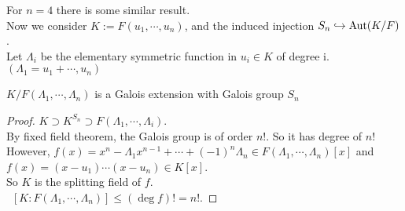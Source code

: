 For  $ n=4  $ there is some similar result.\\
Now we consider  $ K:=F(u_1,\cdots,u_n) $, and the induced injection  $ S_n\hookrightarrow \operatorname{Aut}(K/F)$.\\
Let  $ \Lambda_i  $ be the elementary symmetric function in  $ u_i\in K  $ of degree i. 
 $ (\Lambda_1=u_1+\cdots,u_n) $ 
 \begin{theorem}
     $ K/F(\Lambda_1,\cdots,\Lambda_n) $ is a Galois extension with Galois group  $ S_n $ 
 \end{theorem}
 \begin{proof}
     $ K\supset K^{S_n}\supset F(\Lambda_1,\cdots,\Lambda_i) $.\\
     By fixed field theorem, the Galois group is of order  $ n!  $. So it has degree of  $ n! $\\
     However,  $ f(x)=x^n-\Lambda_1x^{n-1}+\cdots+(-1)^n\Lambda_n\in F(\Lambda_1,\cdots,\Lambda_n)[x] $ and $ f(x)=(x-u_1)\cdots(x-u_n)\in K[x] $.\\
     So  $ K  $ is the splitting field of  $ f  $. \\\
      $ [K:F(\Lambda_1,\cdots,\Lambda_n)] \leq (\deg f)!=n! $.   
 \end{proof}
